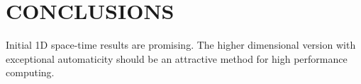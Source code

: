 \documentclass{parcfd2014}
\begin{document}
\section{CONCLUSIONS}
Initial 1D space-time results are promising.
The higher dimensional version with exceptional automaticity should be an attractive method for high performance computing.
\end{document}
